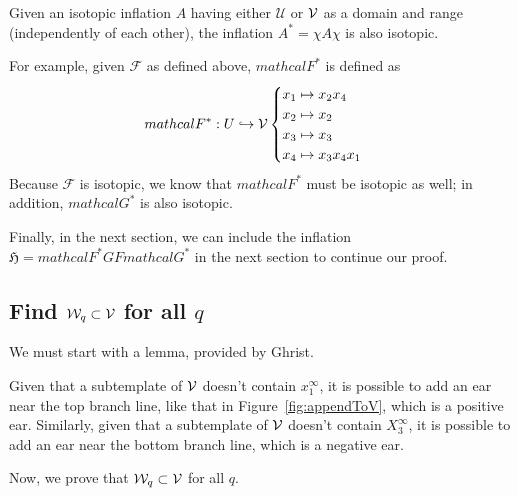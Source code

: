 \documentclass[paper.tex]{subfiles}
\begin{document}
    \begin{lemma}[Ghrist 1997]
        Given an isotopic inflation $A$ having either $\mathcal{U}$ or $\mathcal{V}$ as a domain and range (independently of each other), the inflation $A^* = \chi A \chi$ is also isotopic.
    \end{lemma}

For example, given $\mathcal{F}$ as defined above, $mathcal{F}^*$ is defined as $$mathcal{F}^*: U \hookrightarrow \mathcal{V} \begin{cases} x_1 \mapsto x_2 x_4 \\ x_2 \mapsto x_2 \\ x_3 \mapsto x_3 \\ x_4 \mapsto x_3 x_4 x_1 \end{cases}$$ Because $\mathcal{F}$ is isotopic, we know that $mathcal{F}^*$ must be isotopic as well; in addition, $mathcal{G}^*$ is also isotopic.

    Finally, in the next section, we can include the inflation $\mathfrak{H} = mathcal{F}^* G F mathcal{G}^*$ in the next section to continue our proof.


\subsection{Find $\mathcal{W}_q \subset \mathcal{V}$ for all $q$}

We must start with a lemma, provided by Ghrist.
\begin{lemma}[Ghrist 1997]
    Given that a subtemplate of $\mathcal{V}$ doesn't contain $x_1^\infty$, it is possible to add an ear near the top branch line, like that in Figure~\ref{fig:appendToV}, which is a positive ear. Similarly, given that a subtemplate of $\mathcal{V}$ doesn't contain $X_3^\infty$, it is possible to add an ear near the bottom branch line, which is a negative ear.
\end{lemma}


Now, we prove that $\mathcal{W}_q \subset \mathcal{V}$ for all $q$.
\end{document}
